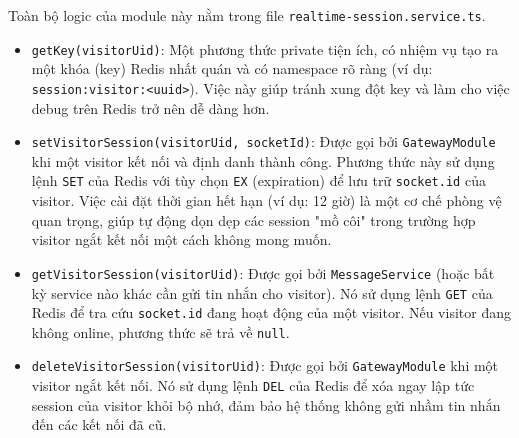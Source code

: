 Toàn bộ logic của module này nằm trong file \texttt{realtime-session.service.ts}.

\begin{itemize}
    \item \texttt{getKey(visitorUid)}: Một phương thức private tiện ích, có nhiệm vụ tạo ra một khóa (key) Redis nhất quán và có namespace rõ ràng (ví dụ: \texttt{session:visitor:<uuid>}). Việc này giúp tránh xung đột key và làm cho việc debug trên Redis trở nên dễ dàng hơn.
    
    \item \texttt{setVisitorSession(visitorUid, socketId)}: Được gọi bởi \texttt{GatewayModule} khi một visitor kết nối và định danh thành công. Phương thức này sử dụng lệnh \texttt{SET} của Redis với tùy chọn \texttt{EX} (expiration) để lưu trữ \texttt{socket.id} của visitor. Việc cài đặt thời gian hết hạn (ví dụ: 12 giờ) là một cơ chế phòng vệ quan trọng, giúp tự động dọn dẹp các session "mồ côi" trong trường hợp visitor ngắt kết nối một cách không mong muốn.
    
    \item \texttt{getVisitorSession(visitorUid)}: Được gọi bởi \texttt{MessageService} (hoặc bất kỳ service nào khác cần gửi tin nhắn cho visitor). Nó sử dụng lệnh \texttt{GET} của Redis để tra cứu \texttt{socket.id} đang hoạt động của một visitor. Nếu visitor đang không online, phương thức sẽ trả về \texttt{null}.
    
    \item \texttt{deleteVisitorSession(visitorUid)}: Được gọi bởi \texttt{GatewayModule} khi một visitor ngắt kết nối. Nó sử dụng lệnh \texttt{DEL} của Redis để xóa ngay lập tức session của visitor khỏi bộ nhớ, đảm bảo hệ thống không gửi nhầm tin nhắn đến các kết nối đã cũ.
\end{itemize}